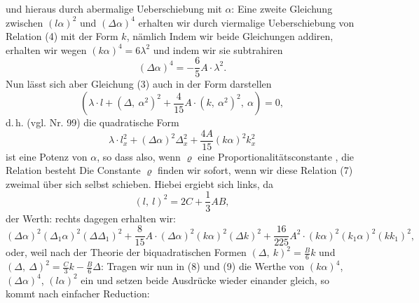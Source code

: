 und hieraus durch abermalige Ueberschiebung mit $\alpha$:
Eine zweite Gleichung zwischen $(l\alpha)^2$ und $(\varDelta\alpha)^4$ erhalten wir durch
viermalige Ueberschiebung von Relation (4) mit der Form $k$, nämlich
Indem wir beide Gleichungen addiren, erhalten wir wegen $(k\alpha)^4=6\lambda^2$
und indem wir sie subtrahiren
\[
(\varDelta\alpha)^4=-\frac{6}{5}A\cdot\lambda^2.
\]
Nun lässt sich aber Gleichung (3) auch in der Form darstellen
\[
\left(\lambda\cdot l+(\varDelta,\ \alpha^2)^2+\frac{4}{15}A\cdot(k,\ \alpha^2)^2,\ \alpha\right)=0,
\]
d.\,h. (vgl. Nr. 99) die quadratische Form
\[
\lambda\cdot l_x^2+(\varDelta\alpha)^2\varDelta_x^2+\frac{4A}{15}(k\alpha)^2k_x^2
\]
ist eine Potenz von $\alpha$, so dass also, wenn $\varrho$ eine Proportionalitätsconstante
, die Relation besteht
Die Constante $\varrho$ finden wir sofort, wenn wir diese Relation (7) zweimal
über sich selbst schieben. Hiebei ergiebt sich links, da
\[
(l,\ l)^2=2C+\frac{1}{3}AB,
\]
der Werth:
rechts dagegen erhalten wir:
\[
(\varDelta\alpha)^2(\varDelta_1\alpha)^2(\varDelta\varDelta_1)^2+\frac{8}{15}A\cdot(\varDelta\alpha)^2(k\alpha)^2(\varDelta k)^2+\frac{16}{225}A^2\cdot(k\alpha)^2(k_1\alpha)^2(kk_1)^2,
\]
oder, weil nach der Theorie der biquadratischen Formen $(\varDelta,\ k)^2=\frac{B}{6}k$
und $(\varDelta,\ \varDelta)^2=\frac{C}{3}k-\frac{B}{6}\varDelta$:
Tragen wir nun in (8) und (9) die Werthe von $(k\alpha)^4$, $(\varDelta\alpha)^4$, $(l\alpha)^2$
ein und setzen beide Ausdrücke wieder einander gleich, so kommt
nach einfacher Reduction:



